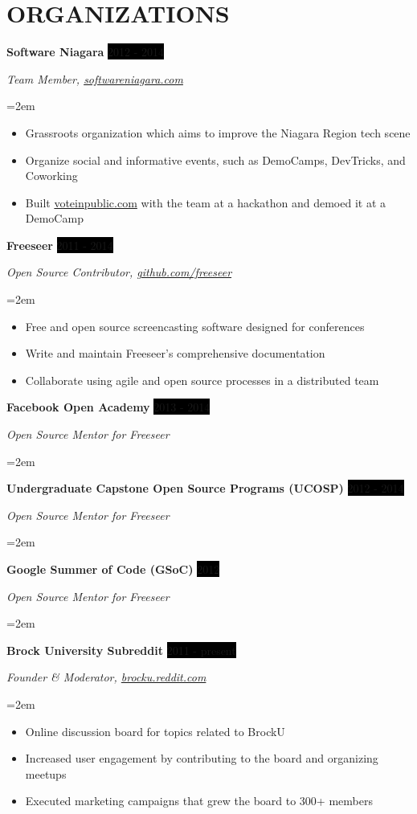 \documentclass[paper=a4,fontsize=11pt]{scrartcl} %
\newcommand{\sepspace}{\vspace*{1em}}   %
\newcommand{\NewPart}[1]{\section*{\uppercase{#1}}}
\newcommand{\EducationEntry}[4]{
    \noindent \textbf{#1} \hfill      %
    \colorbox{Black}{
      \parbox{8.5em}{
      \hfill\color{White}#2}} \par  %
    \noindent \textit{#3} \par        %
    \noindent\hangindent=2em\hangafter=0 \small #4 %
    \normalsize \par}
\newcommand{\OrganizationEntry}[4]{         %
    \noindent \textbf{#1} \hfill            %
    \colorbox{Black}{\color{White}#2} \par  %
    \noindent \textit{#3} \par              %
    \noindent\hangindent=2em\hangafter=0 \small #4 %
    \normalsize \par}
\begin{document}
\NewPart{Organizations}{}


\OrganizationEntry{Software Niagara}{2012 - 2014}
{Team Member, \url{softwareniagara.com}}
{
 \begin{itemize} \itemsep -1pt
   \item Grassroots organization which aims to improve the Niagara Region tech scene
   \item Organize social and informative events, such as DemoCamps, DevTricks, and Coworking
   \item Built \url{voteinpublic.com} with the team at a hackathon and demoed it at a DemoCamp
 \end{itemize}
}
\sepspace

\OrganizationEntry{Freeseer}{2011 - 2014}
{Open Source Contributor, \url{github.com/freeseer}}
{
 \begin{itemize} \itemsep -1pt %
   \item Free and open source screencasting software designed for conferences
   \item Write and maintain Freeseer's comprehensive documentation
   \item Collaborate using agile and open source processes in a distributed team
 \end{itemize}
}
\sepspace

\OrganizationEntry{Facebook Open Academy}{2013 - 2014}
{Open Source Mentor for Freeseer}
\sepspace

\OrganizationEntry{Undergraduate Capstone Open Source Programs (UCOSP)}{2012 - 2014}
{Open Source Mentor for Freeseer}
\sepspace

\OrganizationEntry{Google Summer of Code (GSoC)}{2012}
{Open Source Mentor for Freeseer}
\sepspace

\OrganizationEntry{Brock University Subreddit}{2011 - present}
{Founder \& Moderator, \url{brocku.reddit.com}}
{
 \begin{itemize} \itemsep -1pt
   \item Online discussion board for topics related to BrockU
   \item Increased user engagement by contributing to the board and organizing meetups
   \item Executed marketing campaigns that grew the board to 300+ members
 \end{itemize}
}
\sepspace
\end{document}
